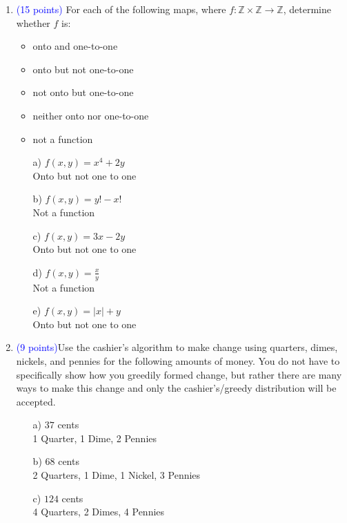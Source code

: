 \documentclass{article}
\newcommand{\pt}[1]{\textcolor{blue}{(#1 points)}}
\begin{document}
\begin{enumerate}
    \item \pt{15} For each of the following maps, where $f : \mathbb{Z}\times\mathbb{Z} \rightarrow \mathbb{Z}$, determine whether $f$ is: 

\begin{itemize}
    \item onto and one-to-one
    \item onto but not one-to-one
    \item not onto but one-to-one
    \item neither onto nor one-to-one
    \item not a function
\end{itemize}


\begin{enumerate}
    \item[a)] $f(x, y) = x^4 + 2y$\\ Onto but not one to one
    \item[b)] $f(x, y) = y! -  x!$\\ Not a function
    \item[c)] $f(x, y) = 3x - 2y$\\ Onto but not one to one
    \item[d)] $f(x, y) = \frac{x}{y}$\\ Not a function
    \item[e)] $f(x, y) = |x| + y$\\ Onto but not one to one
\end{enumerate}

\item \pt{9}Use the cashier's algorithm to make change using quarters, dimes, nickels, and pennies for the following amounts of money. You do not have to specifically show how you greedily formed change, but rather there are many ways to make this change and only the cashier's/greedy distribution will be accepted.
\begin{enumerate}
\item[a)] $37$ cents\\1 Quarter, 1 Dime, 2 Pennies
\item[b)] $68$ cents\\2 Quarters, 1 Dime, 1 Nickel, 3 Pennies
\item[c)] $124$ cents\\4 Quarters, 2 Dimes, 4 Pennies

\end{enumerate}


\end{enumerate}
\end{document}
